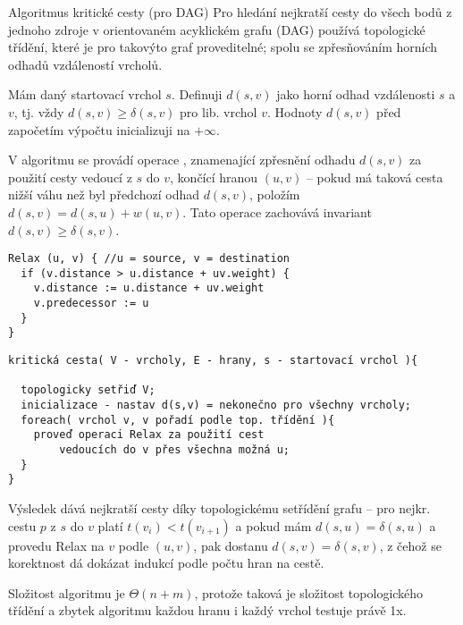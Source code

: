 \begin{algoritmusN}{Algoritmus kritické cesty (pro DAG)}
Pro hledání nejkratší cesty do všech bodů z jednoho zdroje v orientovaném acyklickém grafu (DAG) používá topologické třídění, které je pro takovýto graf proveditelné; spolu se zpřesňováním horních odhadů vzdáleností vrcholů.

Mám daný startovací vrchol $s$. Definuji $d(s,v)$ jako horní odhad vzdálenosti $s$ a $v$, tj. vždy $d(s,v)\geq\delta(s,v)$ pro lib. vrchol $v$. Hodnoty $d(s,v)$ před započetím výpočtu inicializuji na $+\infty$.

V algoritmu se provádí operace , znamenající zpřesnění odhadu $d(s,v)$ za použití cesty vedoucí z $s$ do $v$, končící hranou $(u,v)$ -- pokud má taková cesta nižší váhu než byl předchozí odhad $d(s,v)$, položím $d(s,v)=d(s,u)+w(u,v)$. Tato operace zachovává invariant $d(s,v)\geq\delta(s,v)$.

\begin{verbatim}
Relax (u, v) { //u = source, v = destination
  if (v.distance > u.distance + uv.weight) {
    v.distance := u.distance + uv.weight
    v.predecessor := u
  }
}
\end{verbatim}

\begin{verbatim}
kritická cesta( V - vrcholy, E - hrany, s - startovací vrchol ){

  topologicky setřiď V;
  inicializace - nastav d(s,v) = nekonečno pro všechny vrcholy;
  foreach( vrchol v, v pořadí podle top. třídění ){
    proveď operaci Relax za použití cest
        vedoucích do v přes všechna možná u;
  }
}
\end{verbatim} 

Výsledek dává nejkratší cesty díky topologickému setřídění grafu -- pro nejkr. cestu $p$ z $s$ do $v$ platí $t(v_i)<t(v_{i+1})$ a pokud mám $d(s,u)=\delta(s,u)$ a provedu Relax na $v$ podle $(u,v)$, pak dostanu $d(s,v)=\delta(s,v)$, z čehož se korektnost dá dokázat indukcí podle počtu hran na cestě.

Složitost algoritmu je $\Theta(n+m)$, protože taková je složitost topologického třídění a zbytek algoritmu každou hranu i každý vrchol testuje právě 1x.
\end{algoritmusN}

